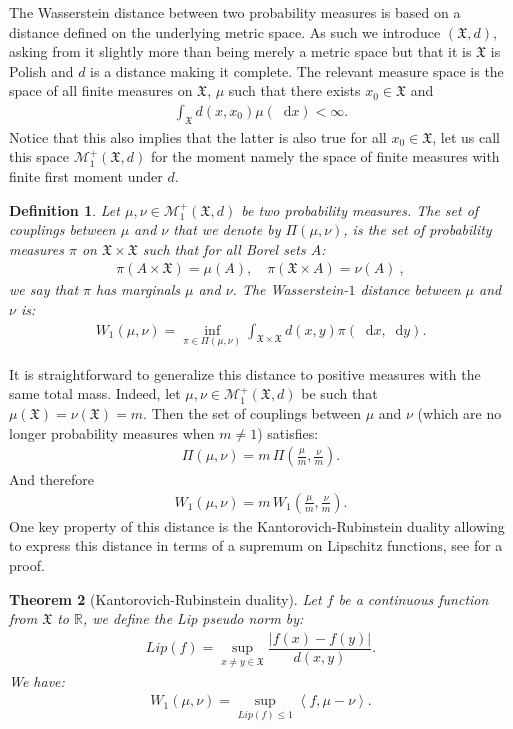 \documentclass[11pt,a4paper]{article}
\newcommand{\RR}{\mathbb{R}}
\newcommand{\MC}{\mathcal{M}}
\newcommand{\XF}{\mathfrak{X}}
\newcommand{\brac}[1]{\left\langle#1\right\rangle}
\newcommand{\dd}{\mathop{}\!\mathrm{d}}
\newtheorem{theorem}{Theorem}[section]
\newtheorem{definition}[theorem]{Definition}
\begin{document}
The Wasserstein distance between two probability measures is based on a distance defined on the underlying metric space. As such we introduce $(\XF,d)$, asking from it slightly more than being merely a metric space but that it is $\XF$ is Polish and $d$ is a distance making it complete. The relevant measure space is the space of all finite measures on $\XF$, $\mu$ such that there exists $x_0 \in \XF$ and 
\begin{align*}
    \int_{\XF} d(x,x_0) \mu(\dd x) < \infty.
\end{align*}
Notice that this also implies that the latter is also true for all $x_0 \in \XF$, let us call this space $\MC^+_1(\XF,d)$ for the moment namely the space of finite measures with finite first moment under $d$.
\begin{definition}\label{def:Wasserstein}
    Let $\mu,\nu \in \MC^+_1(\XF,d)$ be two probability measures. The set of couplings between $\mu$ and $\nu$ that we denote by $\Pi(\mu,\nu)$, is the set of probability measures $\pi$ on $\XF\times \XF$ such that for all Borel sets $A$:
    \begin{align*}
        \pi(A\times\XF) = \mu(A) ,\quad  \pi(\XF\times A) = \nu(A)\ ,
    \end{align*}
    we say that $\pi$ has marginals $\mu$ and $\nu$. The Wasserstein-$1$ distance between $\mu$ and $\nu$ is:
    \begin{align*}
        W_1(\mu,\nu) = \inf\limits_{\pi \in\Pi(\mu,\nu)} \int_{\XF\times \XF} d(x,y) \pi(\dd x,\dd y).
    \end{align*}
\end{definition}
It is straightforward to generalize this distance to positive measures with the same total mass. Indeed, let $\mu, \nu \in \MC^+_1(\XF,d)$ be such that $\mu(\XF) = \nu(\XF) = m$. Then the set of couplings between $\mu$ and $\nu$ (which are no longer probability measures when $m \neq 1$) satisfies:
\begin{align*}
    \Pi(\mu,\nu) = m \, \Pi\left(\frac{\mu}{m}, \frac{\nu}{m}\right).
\end{align*}
And therefore
\begin{align*}
    W_1(\mu,\nu) = m\, W_1\left( \frac{\mu}{m}, \frac{\nu}{m}\right).
\end{align*}
One key property of this distance is the Kantorovich-Rubinstein duality allowing to express this distance in terms of a supremum on Lipschitz functions, see \cite{santambrogio2015optimal} for a proof.
\begin{theorem}[Kantorovich-Rubinstein duality]
    Let $f$ be a continuous function from $\XF$ to $\RR$, we define the Lip pseudo norm by:
    \begin{align*}
        Lip(f) = \sup\limits_{x \neq y \in \XF} \dfrac{\left|f(x) - f(y) \right|}{d(x,y)} .
    \end{align*}
    We have:
    \begin{align*}
        W_1(\mu,\nu) = \sup\limits_{Lip(f) \leq 1} \brac{f,\mu - \nu}.
    \end{align*}
\end{theorem}
\end{document}
